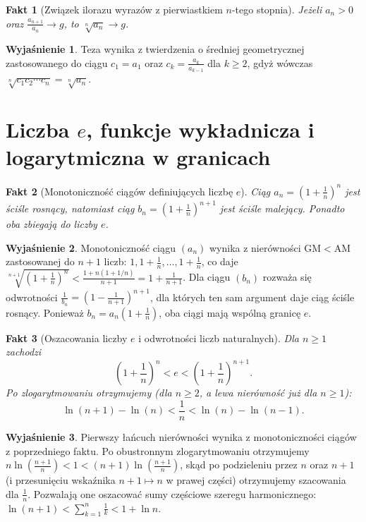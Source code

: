 \documentclass[11pt, a4paper]{article}
\theoremstyle{plain}
\newtheorem{fakt}{Fakt}
\theoremstyle{definition}
\newtheorem*{wyjasnienie}{Wyjaśnienie}
\begin{document}
\begin{fakt}[Związek ilorazu wyrazów z pierwiastkiem $n$-tego stopnia]
Jeżeli $a_n > 0$ oraz $\frac{a_{n+1}}{a_n} \to g$, to $\sqrt[n]{a_n} \to g$.
\end{fakt}

\begin{wyjasnienie}
Teza wynika z twierdzenia o średniej geometrycznej zastosowanego do ciągu $c_1 = a_1$ oraz $c_k = \frac{a_k}{a_{k-1}}$ dla $k \geqslant 2$, gdyż wówczas $\sqrt[n]{c_1 c_2 \cdots c_n} = \sqrt[n]{a_n}$.
\end{wyjasnienie}

\section{Liczba $e$, funkcje wykładnicza i logarytmiczna w granicach}

\begin{fakt}[Monotoniczność ciągów definiujących liczbę $e$]
Ciąg $a_n = \left(1 + \frac{1}{n}\right)^n$ jest ściśle rosnący, natomiast ciąg $b_n = \left(1 + \frac{1}{n}\right)^{n+1}$ jest ściśle malejący. Ponadto oba zbiegają do liczby $e$.
\end{fakt}

\begin{wyjasnienie}
Monotoniczność ciągu $(a_n)$ wynika z nierówności $\mathrm{GM} < \mathrm{AM}$ zastosowanej do $n + 1$ liczb: $1, 1 + \frac{1}{n}, \dots, 1 + \frac{1}{n}$, co daje $\sqrt[n+1]{\left(1 + \frac{1}{n}\right)^n} < \frac{1 + n(1 + 1/n)}{n + 1} = 1 + \frac{1}{n+1}$. Dla ciągu $(b_n)$ rozważa się odwrotności $\frac{1}{b_n} = \left(1 - \frac{1}{n+1}\right)^{n+1}$, dla których ten sam argument daje ciąg ściśle rosnący. Ponieważ $b_n = a_n\left(1 + \frac{1}{n}\right)$, oba ciągi mają wspólną granicę $e$.
\end{wyjasnienie}

\begin{fakt}[Oszacowania liczby $e$ i odwrotności liczb naturalnych]
Dla $n \geqslant 1$ zachodzi
\[
\left(1 + \frac{1}{n}\right)^n < e < \left(1 + \frac{1}{n}\right)^{n+1}.
\]
Po zlogarytmowaniu otrzymujemy (dla $n \geqslant 2$, a lewa nierówność już dla $n \geqslant 1$):
\[
\ln(n+1) - \ln(n) < \frac{1}{n} < \ln(n) - \ln(n-1).
\]
\end{fakt}

\begin{wyjasnienie}
Pierwszy łańcuch nierówności wynika z monotoniczności ciągów z poprzedniego faktu. Po obustronnym zlogarytmowaniu otrzymujemy $n\ln\left(\frac{n+1}{n}\right) < 1 < (n+1)\ln\left(\frac{n+1}{n}\right)$, skąd po podzieleniu przez $n$ oraz $n+1$ (i przesunięciu wskaźnika $n+1 \mapsto n$ w prawej części) otrzymujemy szacowania dla $\frac{1}{n}$. Pozwalają one oszacować sumy częściowe szeregu harmonicznego: $\ln(n+1) < \sum_{k=1}^n \frac{1}{k} < 1 + \ln n$.
\end{wyjasnienie}
\end{document}
